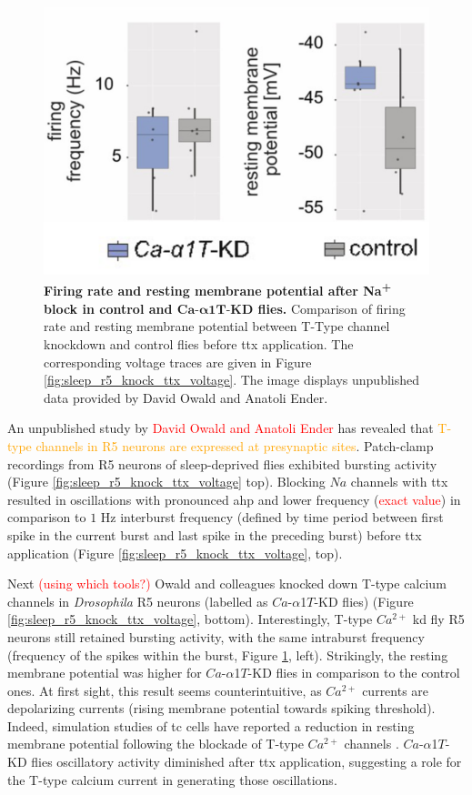 \documentclass[../main.tex]{subfiles}
\begin{document}
\begin{figure}[!t]
    \centering
    \includegraphics[width=0.5\linewidth]{../img/sleep_and_r5_network/CaaT_knock_and_ttx/frequencies_whole.png}
    \caption[Firing rate and resting membrane potential after $Na$\textsuperscript{+} block in control and $Ca\text{-}\alpha1T\text{-KD}$ flies]{
        \textbf{Firing rate and resting membrane potential after Na\textsuperscript{+} block in control and $\bm{Ca\text{-}\alpha1T\text{-KD}}$ flies.}
        Comparison of firing rate and resting membrane potential between T-Type channel knockdown and control flies before \gls{ttx} application. The corresponding voltage traces are given in Figure \ref{fig:sleep_r5_knock_ttx_voltage}.
        The image displays unpublished data provided by David Owald and Anatoli Ender.
    }
    \label{fig:sleep_r5_knock_ttx_frequencies}
\end{figure}

An unpublished study by \textcolor{red}{David Owald and Anatoli Ender} has revealed that \textcolor{orange}{T-type channels in R5 neurons are expressed at presynaptic sites}.
Patch-clamp recordings from R5 neurons of sleep-deprived flies exhibited bursting activity (Figure \ref{fig:sleep_r5_knock_ttx_voltage} top). Blocking $Na$ channels with \gls{ttx} resulted in oscillations with pronounced \gls{ahp} and lower frequency (\textcolor{red}{exact value}) in comparison to $1$ Hz interburst frequency (defined by time period between first spike in the current burst and last spike in the preceding burst) before \gls{ttx} application (Figure \ref{fig:sleep_r5_knock_ttx_voltage}, top).

Next \textcolor{red}{(using which tools?)} Owald and colleagues knocked down T-type calcium channels in \textit{Drosophila} R5 neurons (labelled as $Ca$-$\alpha$1$T$-KD flies) (Figure \ref{fig:sleep_r5_knock_ttx_voltage}, bottom). Interestingly, T-type $Ca^{2+}$ \gls{kd} fly R5 neurons still retained bursting activity, with the same intraburst frequency (frequency of the spikes within the burst, Figure \ref{fig:sleep_r5_knock_ttx_frequencies}, left). Strikingly, the resting membrane potential was higher for $Ca$-$\alpha$1$T$-KD flies in comparison to the control ones. At first sight, this result seems counterintuitive, as $Ca^{2+}$ currents are depolarizing currents (rising membrane potential towards spiking threshold). Indeed, simulation studies of \gls{tc} cells have reported a reduction in resting membrane potential following the blockade of T-type $Ca^{2+}$ channels \parencite{amarilloInterplaySevenSubthreshold2014}.
$Ca$-$\alpha$1$T$-KD flies oscillatory activity diminished after \gls{ttx} application, suggesting a role for the T-type calcium current in generating those oscillations.
\end{document}
